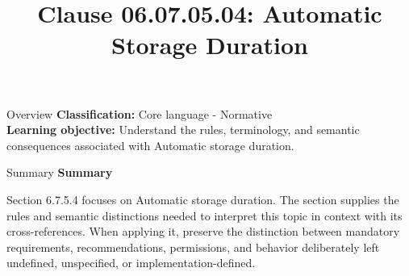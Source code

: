 \documentclass[10pt,letterpaper]{article}
\title{Clause 06.07.05.04: Automatic Storage Duration}
\author{}
\date{}
\begin{document}
\maketitle
\begin{CornellOverviewBox}{Overview}
\textbf{Classification:} Core language - Normative\\[2pt]
\textbf{Learning objective:} Understand the rules, terminology, and semantic consequences associated with Automatic storage duration.
\end{CornellOverviewBox}\begin{CornellSummaryBox}{Summary}
{\sffamily\bfseries\color{Accent} Summary}\par\vspace{3pt}Section 6.7.5.4 focuses on Automatic storage duration. The section supplies the rules and semantic distinctions needed to interpret this topic in context with its cross-references. When applying it, preserve the distinction between mandatory requirements, recommendations, permissions, and behavior deliberately left undefined, unspecified, or implementation-defined.
\end{CornellSummaryBox}
\end{document}
